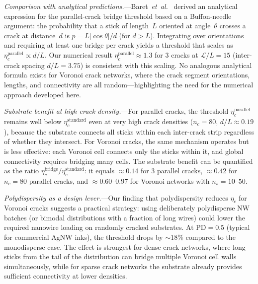 \textit{Comparison with analytical predictions.}---Baret~\textit{et~al.}~\cite{Baret2024} derived an analytical
expression for the parallel-crack bridge threshold based on
a Buffon-needle argument: the probability that a stick of
length~$L$ oriented at angle~$\theta$ crosses a crack at
distance~$d$ is $p = L|\cos\theta|/d$ (for $d > L$).
Integrating over orientations and requiring at least one
bridge per crack yields a threshold that scales as
$\eta_c^\mathrm{parallel} \propto d/L$.
Our numerical result $\eta_c^\mathrm{parallel} \approx 1.3$
for 3 cracks at $\mathcal{L}/L = 15$ (inter-crack spacing
$d/L = 3.75$) is consistent with this scaling.
No analogous analytical formula exists for Voronoi crack
networks, where the crack segment orientations, lengths,
and connectivity are all random---highlighting the need for
the numerical approach developed here.

\textit{Substrate benefit at high crack density.}---For
parallel cracks, the threshold $\eta_c^\mathrm{parallel}$
remains well below $\eta_c^\mathrm{standard}$ even at very
high crack densities ($n_c = 80$, $d/L \approx 0.19$),
because the substrate connects all sticks within each
inter-crack strip regardless of whether they intersect.
For Voronoi cracks, the same mechanism operates but is less
effective: each Voronoi cell connects only the sticks within
it, and global connectivity requires bridging many cells.
The substrate benefit can be quantified as the ratio
$\eta_c^\mathrm{bridge}/\eta_c^\mathrm{standard}$:
it equals $\approx 0.14$ for 3 parallel cracks,
$\approx 0.42$ for $n_c = 80$ parallel cracks,
and $\approx 0.60$--$0.97$ for Voronoi networks
with $n_s = 10$--$50$.

\textit{Polydispersity as a design lever.}---Our finding that
polydispersity reduces $\eta_c$ for Voronoi cracks suggests
a practical strategy: using deliberately polydisperse NW batches
(or bimodal distributions with a fraction of long wires)
could lower the required nanowire loading on randomly cracked
substrates.
At $\mathrm{PD} = 0.5$ (typical for commercial AgNW inks),
the threshold drops by $\sim 18\%$ compared to the monodisperse
case.
The effect is strongest for dense crack networks,
where long sticks from the tail of the distribution can
bridge multiple Voronoi cell walls simultaneously,
while for sparse crack networks the substrate already provides
sufficient connectivity at lower densities.


